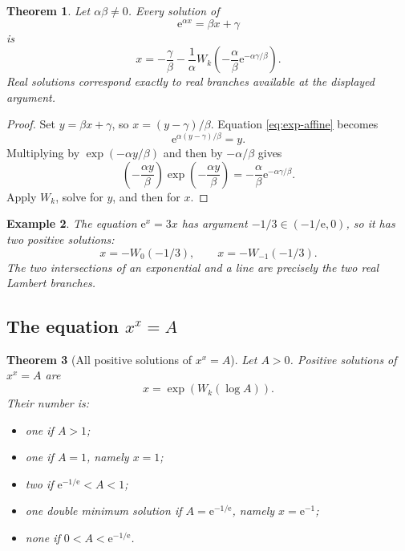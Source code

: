 \documentclass[11pt]{article}
\newtheorem{theorem}{Theorem}[section]
\newtheorem{example}[theorem]{Example}
\theoremstyle{remark}
\newcommand{\ee}{\mathrm e}
\begin{document}
\begin{theorem}\label{thm:exp-affine}
Let \(\alpha\beta\neq0\).  Every solution of
\begin{equation}\label{eq:exp-affine}
       \ee^{\alpha x}=\beta x+\gamma
\end{equation}
is
\begin{equation}\label{eq:exp-affine-sol}
 \boxed{\displaystyle
 x=-\frac{\gamma}{\beta}
   -\frac1\alpha
 W_k\left(
  -\frac{\alpha}{\beta}
  \ee^{-\alpha\gamma/\beta}
 \right).}
\end{equation}
Real solutions correspond exactly to real branches available at the
displayed argument.
\end{theorem}

\begin{proof}
Set \(y=\beta x+\gamma\), so \(x=(y-\gamma)/\beta\).  Equation
\eqref{eq:exp-affine} becomes
\[
       \ee^{\alpha(y-\gamma)/\beta}=y.
\]
Multiplying by \(\exp(-\alpha y/\beta)\) and then by
\(-\alpha/\beta\) gives
\[
 \left(-\frac{\alpha y}{\beta}\right)
 \exp\left(-\frac{\alpha y}{\beta}\right)
 =
 -\frac{\alpha}{\beta}\ee^{-\alpha\gamma/\beta}.
\]
Apply \(W_k\), solve for \(y\), and then for \(x\).
\end{proof}

\begin{example}
The equation \(\ee^x=3x\) has argument \(-1/3\in(-1/\ee,0)\), so it has
two positive solutions:
\[
       x=-W_0(-1/3),\qquad x=-W_{-1}(-1/3).
\]
The two intersections of an exponential and a line are precisely the two
real Lambert branches.
\end{example}

\subsection{The equation \texorpdfstring{\(x^x=A\)}{x to the x equals A}}

\begin{theorem}[All positive solutions of \(x^x=A\)]\label{thm:xtox}
Let \(A>0\).  Positive solutions of \(x^x=A\) are
\begin{equation}\label{eq:xtox}
       x=\exp(W_k(\log A)).
\end{equation}
Their number is:
\begin{itemize}
\item one if \(A>1\);
\item one if \(A=1\), namely \(x=1\);
\item two if \(\ee^{-1/\ee}<A<1\);
\item one double minimum solution if \(A=\ee^{-1/\ee}\), namely
\(x=\ee^{-1}\);
\item none if \(0<A<\ee^{-1/\ee}\).
\end{itemize}
\end{theorem}
\end{document}
